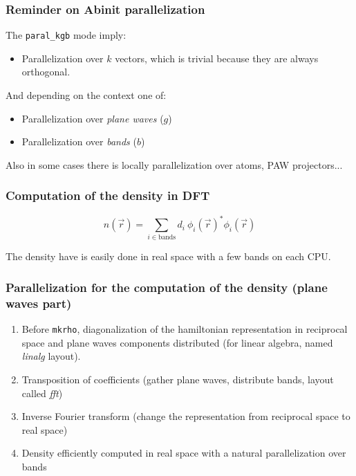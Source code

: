 \begin{frame}
  \frametitle{Reminder on Abinit parallelization}
  
  The \texttt{paral\_kgb} mode imply:
  \begin{itemize}
    \item Parallelization over $k$ vectors, which is trivial because
    they are always orthogonal.
  \end{itemize}

  And depending on the context one of:

  \begin{itemize}
    \item Parallelization over \emph{plane waves} ($g$)
    \item Parallelization over \emph{bands} ($b$)
  \end{itemize}
  Also in some cases there is locally parallelization over atoms, PAW projectors...
\end{frame}

\begin{frame}
  \frametitle{Computation of the density in DFT}
  \begin{equation}
    n(\vec{r}) = \sum_{i \in \text{bands}} d_i~\phi_i(\vec{r})^* \phi_i(\vec{r})
    \label{eq:dft_density}
  \end{equation}

  The density have is easily done in real space with a few bands on each CPU.
 
\end{frame}

\begin{frame}
  \frametitle{Parallelization for the computation of the density (plane waves part)}
  \begin{enumerate}
    \item Before \texttt{mkrho}, diagonalization of the hamiltonian \Rightarrow
      representation in reciprocal space and plane waves components distributed (for linear algebra, named \emph{linalg} layout).
    \item Transposition of coefficients (gather plane waves, distribute bands, layout called \emph{fft}) 
    \item Inverse Fourier transform (change the representation from reciprocal space to real space)
    \item Density efficiently computed in real space with a natural parallelization
      over bands 
  \end{enumerate}
  

\end{frame}

